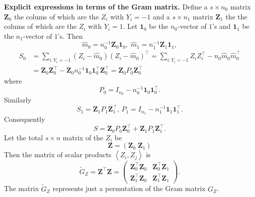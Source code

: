 \documentclass[11pt,twoside]{article}%
\theoremstyle{change}
\begin{document}
\bigskip

\textbf{Explicit expressions in terms of the Gram matrix. } Define a $s\times
n_{0}$ matrix $\mathbf{Z}_{0}$ the colums of which are the $Z_{i}$ with
$Y_{i}=-1$ and a $s\times n_{1}$ matrix $\mathbf{Z}_{1}$ the the colums of
which are the $Z_{i}$ with $Y_{i}=1$. Let $\mathbf{1}_{0}$ be the $n_{0}%
$-vector of $1$'s and $\mathbf{1}_{1}$ be the $n_{1}$-vector of $1$'s$.$ Then%
\[
\hat{m}_{0}=n_{0}^{-1}\mathbf{Z}_{0}\mathbf{1}_{0},\;\hat{m}_{1}=n_{1}%
^{-1}\mathbf{Z}_{1}\mathbf{1}_{1},
\]%
\begin{align*}
S_{0}  & =\sum_{i:Y_{i}=-1}\left(  Z_{i}-\hat{m}_{0}\right)  \left(
Z_{i}-\hat{m}_{0}\right)  ^{\top}=\sum_{i:Y_{i}=-1}Z_{i}Z_{i}^{\top}-n_{0}%
\hat{m}_{0}\hat{m}_{0}^{\top}\\
& =\mathbf{Z}_{0}\mathbf{Z}_{0}^{\top}-\mathbf{Z}_{0}n_{0}^{-1}\mathbf{1}%
_{0}\mathbf{1}_{0}^{\top}\mathbf{Z}_{0}^{\top}=\mathbf{Z}_{0}P_{0}%
\mathbf{Z}_{0}^{\top}%
\end{align*}
where
\[
P_{0}=I_{n_{0}}-n_{0}^{-1}\mathbf{1}_{0}\mathbf{1}_{0}^{\top}.
\]
Similarly \
\[
S_{1}=\mathbf{Z}_{1}P_{1}\mathbf{Z}_{1}^{\top}\text{, }P_{1}=I_{n_{1}}%
-n_{1}^{-1}\mathbf{1}_{1}\mathbf{1}_{1}^{\top}.
\]
Consequently
\[
S=\mathbf{Z}_{0}P_{0}\mathbf{Z}_{0}^{\top}+\mathbf{Z}_{1}P_{1}\mathbf{Z}%
_{1}^{\top}.
\]
Let the total $s\times n$ matrix of the $Z_{i}$ be
\[
\mathbf{Z}=\left(  \mathbf{Z}_{0}\;\mathbf{Z}_{1}\right)
\]
Then the matrix of scalar products $\left\langle Z_{i},Z_{j}\right\rangle $
is
\[
\tilde{G}_{Z}=\mathbf{Z}^{\top}\mathbf{Z}=%
\begin{pmatrix}
\mathbf{Z}_{0}^{\top}\mathbf{Z}_{0} & \mathbf{Z}_{0}^{\top}\mathbf{Z}_{1}\\
\mathbf{Z}_{1}^{\top}\mathbf{Z}_{0} & \mathbf{Z}_{1}^{\top}\mathbf{Z}_{1}%
\end{pmatrix}
.
\]
The matrix $\tilde{G}_{Z}$ represents just a permutation of the Gram matrix
$G_{Z}$.
\end{document}
